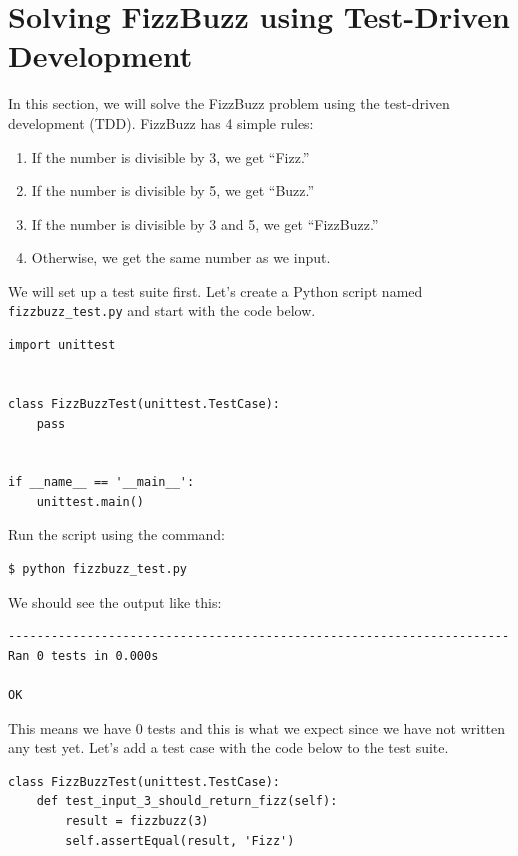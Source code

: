 \documentclass{article}
\begin{document}
\section*{Solving FizzBuzz using Test-Driven Development}

\noindent In this section, we will solve the FizzBuzz problem using the
test-driven development (TDD). FizzBuzz has 4 simple rules:

\begin{enumerate}
  \item If the number is divisible by 3, we get ``Fizz.''
  \item If the number is divisible by 5, we get ``Buzz.''
  \item If the number is divisible by 3 and 5, we get ``FizzBuzz.''
  \item Otherwise, we get the same number as we input.
\end{enumerate}

\noindent We will set up a test suite first. Let's create a Python script named
{\tt fizzbuzz\_test.py} and start with the code below.

\begin{verbatim}
import unittest


class FizzBuzzTest(unittest.TestCase):
    pass


if __name__ == '__main__':
    unittest.main()
\end{verbatim}

\noindent Run the script using the command:

\begin{verbatim}
$ python fizzbuzz_test.py
\end{verbatim}

\noindent We should see the output like this:

\begin{verbatim}
----------------------------------------------------------------------
Ran 0 tests in 0.000s

OK
\end{verbatim}

\noindent This means we have 0 tests and this is what we expect since we have
not written any test yet. Let's add a test case with the code below to the test
suite.

\begin{verbatim}
class FizzBuzzTest(unittest.TestCase):
    def test_input_3_should_return_fizz(self):
        result = fizzbuzz(3)
        self.assertEqual(result, 'Fizz')
\end{verbatim}
\end{document}
